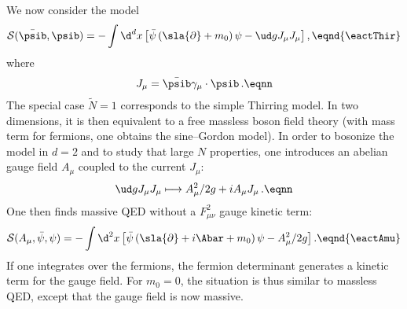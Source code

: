 We now consider the model 
$${\cal S}(\bar\psib,\psib)= - \int \d^d
x\left[\bar\psi\left(\sla{\partial}+m_0
\right) \psi - \ud g J_{\mu}J_{\mu}\right] ,\eqnd{\eactThir} $$
where
$$J_{\mu}=\bar\psib\gamma_{\mu}\cdot\psib\, . \eqnn $$
The special case ${\tilde N}=1$ corresponds to the simple Thirring
model. In two dimensions, it is then equivalent to a free massless
boson field theory (with mass term for fermions, one obtains the
sine--Gordon model). In order to bosonize the model in $d=2$ and
to study that large $N$ properties, one introduces an abelian
gauge field $A_\mu$ coupled to the current $J_\mu$:
$$\ud g  J_{\mu}J_{\mu} \longmapsto A_{\mu}^2/2g +iA_{\mu}J_{\mu}\, .
\eqnn $$
One then finds massive QED without a $F^2_{\mu\nu}$ gauge kinetic term:
$${\cal S}(A_{\mu},\bar\psi,\psi)= - \int \d^2
x\left[\bar\psi\left(\sla{\partial}+ i\Abar+ m_0 \right)\psi
-A_{\mu}^2 /2g\right] . \eqnd{\eactAmu} $$ If one integrates over
the fermions, the fermion determinant generates a  kinetic term
for the gauge field. For $m_0=0$, the situation is thus similar to
massless QED, except that the gauge field is now massive.
